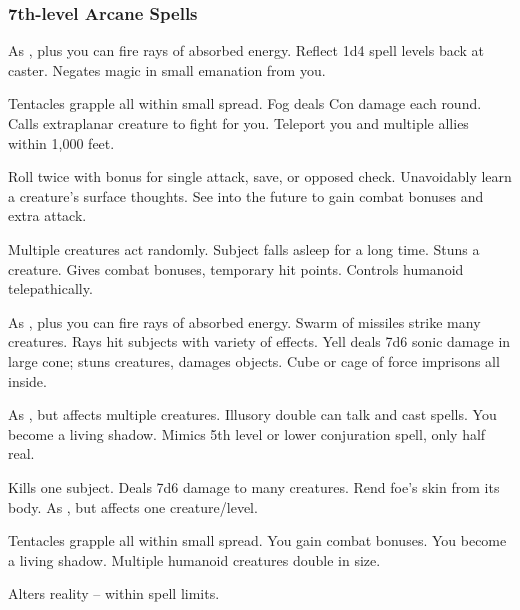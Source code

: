 \subsubsection{7th-level Arcane Spells}
\begin{swspelllist}
   As , plus you can fire rays of absorbed energy.
   Reflect 1d4 spell levels back at caster.
   Negates magic in small emanation from you.

   Tentacles grapple all within small spread.
   Fog deals Con damage each round.
   Calls extraplanar creature to fight for you.
   Teleport you and multiple allies within 1,000 feet.

   Roll twice with bonus for single attack, save, or opposed check.
   Unavoidably learn a creature's surface thoughts.
   See into the future to gain combat bonuses and extra attack.

   Multiple creatures act randomly.
   Subject falls asleep for a long time.
   Stuns a creature.
   Gives combat bonuses, temporary hit points.
   Controls humanoid telepathically.

   As , plus you can fire rays of absorbed energy.
   Swarm of missiles strike many creatures.
   Rays hit subjects with variety of effects.
   Yell deals 7d6 sonic damage in large cone; stuns creatures, damages objects.
  \M Cube or cage of force imprisons all inside.

   As , but affects multiple creatures.
   Illusory double can talk and cast spells.
   You become a living shadow.
   Mimics 5th level or lower conjuration spell, only half real. 

   Kills one subject.
   Deals 7d6 damage to many creatures.
   Rend foe's skin from its body.
   As , but affects one creature/level.

   Tentacles grapple all within small spread.
  \M You gain combat bonuses.
   You become a living shadow.
   Multiple humanoid creatures double in size.

  \M Alters reality -- within spell limits.
\end{swspelllist}

